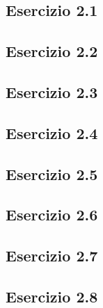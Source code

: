 \subsection{\textbf{Esercizio 2.1}}

\subsection{\textbf{Esercizio 2.2}}

\subsection{\textbf{Esercizio 2.3}}

\subsection{\textbf{Esercizio 2.4}}

\subsection{\textbf{Esercizio 2.5}}

\subsection{\textbf{Esercizio 2.6}}

\subsection{\textbf{Esercizio 2.7}}

\subsection{\textbf{Esercizio 2.8}}


